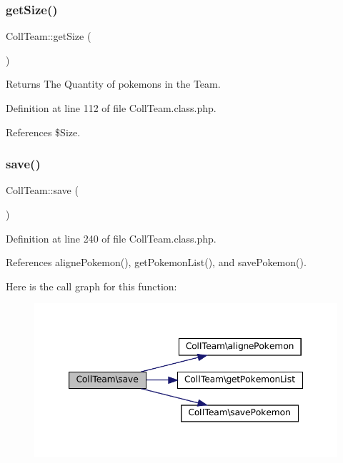 \subsubsection{\texorpdfstring{get\+Size()}{getSize()}}
{\footnotesize\ttfamily Coll\+Team\+::get\+Size (\begin{DoxyParamCaption}{ }\end{DoxyParamCaption})}

\begin{DoxyReturn}{Returns}
The Quantity of pokemons in the Team. 
\end{DoxyReturn}


Definition at line 112 of file Coll\+Team.\+class.\+php.



References \$\+Size.

\mbox{\label{class_coll_team_a6dad47a2d2c75f8d404303ee172cae8b}} 
\subsubsection{\texorpdfstring{save()}{save()}}
{\footnotesize\ttfamily Coll\+Team\+::save (\begin{DoxyParamCaption}{ }\end{DoxyParamCaption})}



Definition at line 240 of file Coll\+Team.\+class.\+php.



References aligne\+Pokemon(), get\+Pokemon\+List(), and save\+Pokemon().

Here is the call graph for this function\+:\nopagebreak
\begin{figure}[H]
\begin{center}
\leavevmode
\includegraphics[width=347pt]{class_coll_team_a6dad47a2d2c75f8d404303ee172cae8b_cgraph}
\end{center}
\end{figure}
\mbox{\label{class_coll_team_aa72d17df4167ca7a0a71ff6c7dd9dc19}} 
